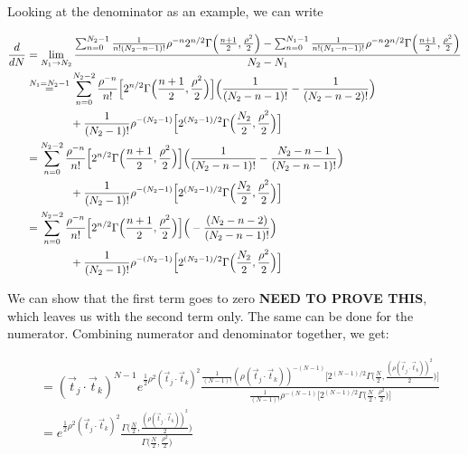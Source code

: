 \documentclass[12pt]{article}
\newcommand{\ptjtk}{\rho(\vec{t}_j\cdot\vec{t}_k)}
\newcommand{\tjtk}{(\vec{t}_j\cdot\vec{t}_k)}
\begin{document}
Looking at the denominator as an example, we can write
   
   \begin{align}
   \frac{d}{dN} &= \lim_{N_1\rightarrow N_2} \frac{ \sum_{n=0}^{N_2-1} \frac{1}{n!(N_2-n-1)!} \rho^{-n} 2^{n/2} \Gamma \Big(\frac{n+1}{2},\frac{\rho^2}{2}\Big) 
   - \sum_{n=0}^{N_1-1} \frac{1}{n!(N_1-n-1)!} \rho^{-n} 2^{n/2} \Gamma \Big(\frac{n+1}{2},\frac{\rho^2}{2}\Big) }
   {N_2-N_1} \\
   &\stackrel{N_1 = N_2-1}{=} \sum^{N_2-2}_{n=0} \frac{\rho^{-n}}{n!} \Big[2^{n/2}\Gamma \Big(\frac{n+1}{2},\frac{\rho^2}{2}\Big) \Big] \Big(\frac{1}{(N_2-n-1)!} - \frac{1}{(N_2-n-2)!} \Big) \\
   \notag & \qquad\qquad
   + \frac{1}{(N_2-1)!} \rho^{-(N_2-1)} \Big[ 2^{(N_2-1)/2} \Gamma \Big(\frac{N_2}{2},\frac{\rho^2}{2}\Big) \Big] \\
   &= \sum^{N_2-2}_{n=0} \frac{\rho^{-n}}{n!} \Big[2^{n/2}\Gamma \Big(\frac{n+1}{2},\frac{\rho^2}{2}\Big) \Big] \Big(\frac{1}{(N_2-n-1)!} - \frac{N_2-n-1}{(N_2-n-1)!} \Big) \\
   \notag & \qquad\qquad
   + \frac{1}{(N_2-1)!} \rho^{-(N_2-1)} \Big[ 2^{(N_2-1)/2} \Gamma \Big(\frac{N_2}{2},\frac{\rho^2}{2}\Big) \Big] \\
   &= \sum^{N_2-2}_{n=0} \frac{\rho^{-n}}{n!} \Big[2^{n/2}\Gamma \Big(\frac{n+1}{2},\frac{\rho^2}{2}\Big) \Big] \Big(-\frac{(N_2-n-2)}{(N_2-n-1)!} \Big) \\
   \notag & \qquad\qquad
   + \frac{1}{(N_2-1)!} \rho^{-(N_2-1)} \Big[ 2^{(N_2-1)/2} \Gamma \Big(\frac{N_2}{2},\frac{\rho^2}{2}\Big) \Big] \\
   \end{align}
   
We can show that the first term goes to zero {\bf NEED TO PROVE THIS}, which leaves us with the second term only. The same can be done for the numerator. Combining numerator and denominator together, we get:

   \begin{align}
   &= \tjtk^{N-1}e^{\frac{1}{2}\rho^2\tjtk^2} \frac{ \frac{1}{(N-1)!} (\ptjtk)^{-(N-1)} \Big[ 2^{(N-1)/2} \Gamma \Big(\frac{N}{2},\frac{(\ptjtk)^2}{2}\Big) \Big] } 
   { \frac{1}{(N-1)!} \rho^{-(N-1)} \Big[ 2^{(N-1)/2} \Gamma \Big(\frac{N}{2},\frac{\rho^2}{2}\Big) \Big] } \\
   &= e^{\frac{1}{2}\rho^2\tjtk^2} \frac{ \Gamma \Big(\frac{N}{2},\frac{(\ptjtk)^2}{2}\Big) } 
   { \Gamma \Big(\frac{N}{2},\frac{\rho^2}{2}\Big) } 
   \end{align}
   
\end{document}
